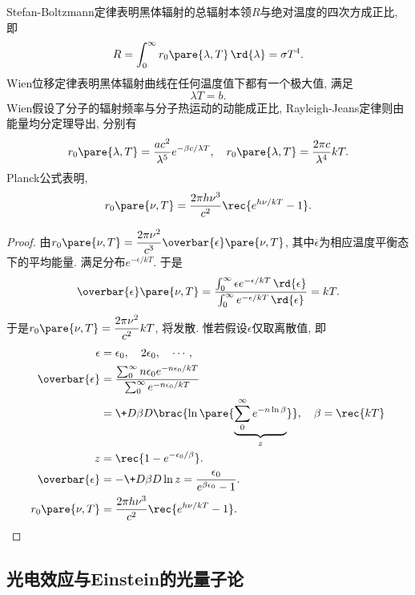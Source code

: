 \documentclass{ctexart}
\begin{document}
Stefan-Boltzmann定律表明黑体辐射的总辐射本领$R$与绝对温度的四次方成正比, 即
\[ R = \int_0^\infty r_0\pare{\lambda,T}\,\rd{\lambda} = \sigma T^4. \]
Wien位移定律表明黑体辐射曲线在任何温度值下都有一个极大值, 满足
\[ \lambda T = b. \]
Wien假设了分子的辐射频率与分子热运动的动能成正比, Rayleigh-Jeans定律则由能量均分定理导出, 分别有
\[ r_0\pare{\lambda,T} = \frac{ac^2}{\lambda^5}e^{-\beta c/\lambda T},\quad r_0\pare{\lambda,T} = \frac{2\pi c}{\lambda^4}kT. \]
Planck公式表明,
\[ r_0\pare{\nu,T} = \frac{2\pi h\nu^3}{c^2} \rec{e^{h\nu/kT}-1}. \]
\begin{proof}
    由$\displaystyle r_0\pare{\nu,T} = \frac{2\pi \nu^2}{c^3}\overbar{\epsilon}\pare{\nu,T}$, 其中$\overbar{\epsilon}$为相应温度平衡态下的平均能量. 满足分布$e^{-\epsilon/kT}$. 于是
    \[ \overbar{\epsilon}\pare{\nu,T} = \frac{\int_0^\infty \epsilon e^{-\epsilon/kT}\,\rd{\epsilon}}{\int_0^\infty e^{-\epsilon/kT}\,\rd{\epsilon}} = kT. \]
    于是$r_0\pare{\nu,T} = \displaystyle \frac{2\pi\nu^2}{c^2}kT$, 将发散. 惟若假设$\epsilon$仅取离散值, 即
    \begin{align*}
        \epsilon &= \epsilon_0,\quad 2\epsilon_0,\quad \cdots, \\
        \overbar{\epsilon} &= \frac{\sum_0^\infty n\epsilon_0 e^{-n\epsilon_0/kT}}{\sum_0^\infty e^{-n\epsilon_0/kT}} \\
        &= \+D{\beta}D{}\brac{\ln\pare{\underbrace{\sum_0^\infty e^{-n\ln\beta}}_{z}}},\quad \beta = \rec{kT} \\
        z &= \rec{1-e^{-\epsilon_0/\beta}}. \\
        \overbar{\epsilon} &= -\+D\beta D{} \ln z = \frac{\epsilon_0}{e^{\beta\epsilon_0}-1}. \\
        r_0\pare{\nu,T} &= \frac{2\pi h\nu^3}{c^2}\rec{e^{h\nu/kT}-1}. \qedhere
    \end{align*}
\end{proof}



\subsection{光电效应与Einstein的光量子论} %
\label{sub:光电效应与einstein的光量子论}
\end{document}
